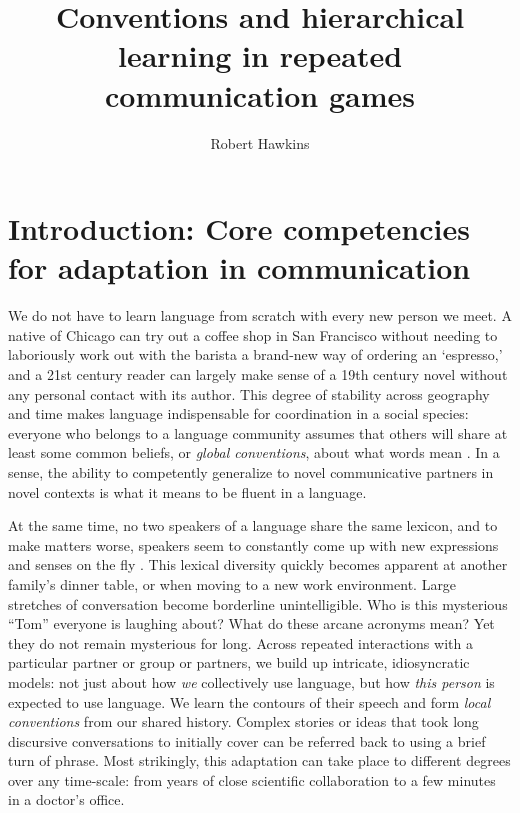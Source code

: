 \documentclass[11pt, floatsintext, man]{apa6}
\title{Conventions and hierarchical learning in repeated communication games}
\author{Robert Hawkins}
\affiliation{Stanford University}
\begin{document}
\maketitle

\section{Introduction: Core competencies for adaptation in communication}

We do not have to learn language from scratch with every new person we meet. A native of Chicago can try out a coffee shop in San Francisco without needing to laboriously work out with the barista a brand-new way of ordering an `espresso,' and a 21st century reader can largely make sense of a 19th century novel without any personal contact with its author. This degree of stability across geography and time makes language indispensable for coordination in a social species: everyone who belongs to a language community assumes that others will share at least some common beliefs, or \emph{global conventions}, about what words mean \cite{Lewis69_Convention}. In a sense, the ability to competently generalize to novel communicative partners in novel contexts is what it means to be fluent in a language.

At the same time, no two speakers of a language share the same lexicon, and to make matters worse, speakers seem to constantly come up with new expressions and senses on the fly \cite{Davidson86_DerangementOfEpitaphs, Clark98_CommunalLexicons}. This lexical diversity quickly becomes apparent at another family's dinner table, or when moving to a new work environment. Large stretches of conversation become borderline unintelligible. Who is this mysterious ``Tom'' everyone is laughing about? What do these arcane acronyms mean? Yet they do not remain mysterious for long. Across repeated interactions with a particular partner or group or partners, we build up intricate, idiosyncratic models: not just about how \emph{we} collectively use language, but how \emph{this person} is expected to use language. We learn the contours of their speech and form \emph{local conventions} from our shared history. Complex stories or ideas that took long discursive conversations to initially cover can be referred back to using a brief turn of phrase. Most strikingly, this adaptation can take place to different degrees over any time-scale: from years of close scientific collaboration to a few minutes in a doctor's office.
\end{document}
